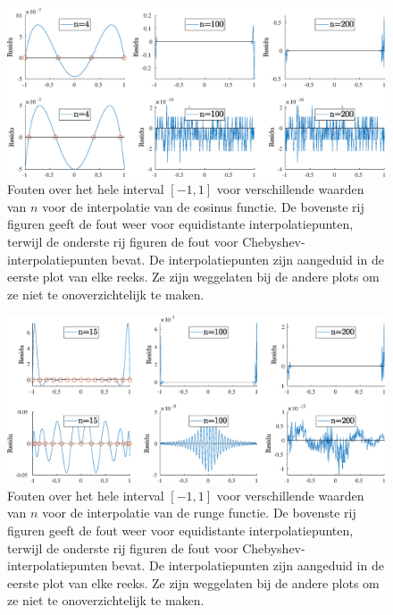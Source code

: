 \documentclass[a4paper, 12pt, titlepage, fleqn]{article}
\begin{document}
\begin{figure}
\centering
\includegraphics[width = \linewidth]{../Afbeeldingen/cos_heleFout.eps}
\caption{Fouten over het hele interval $[-1,1]$ voor verschillende waarden van $n$ voor de interpolatie van de cosinus functie. De bovenste rij figuren geeft de fout weer voor equidistante interpolatiepunten, terwijl de onderste rij figuren de fout voor Chebyshev-interpolatiepunten bevat. De interpolatiepunten zijn aangeduid in de eerste plot van elke reeks. Ze zijn weggelaten bij de andere plots om ze niet te onoverzichtelijk te maken.}
\label{fig:cosHeleFout}
\end{figure}

\begin{figure}
\centering
\includegraphics[width = \linewidth]{../Afbeeldingen/runge_heleFout.eps}
\caption{Fouten over het hele interval $[-1,1]$ voor verschillende waarden van $n$ voor de interpolatie van de runge functie. De bovenste rij figuren geeft de fout weer voor equidistante interpolatiepunten, terwijl de onderste rij figuren de fout voor Chebyshev-interpolatiepunten bevat. De interpolatiepunten zijn aangeduid in de eerste plot van elke reeks. Ze zijn weggelaten bij de andere plots om ze niet te onoverzichtelijk te maken.}
\label{fig:rungeHeleFout}
\end{figure}
\end{document}
